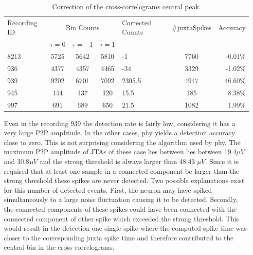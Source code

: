 \documentclass{article}
\begin{document}
\begin{table}[!h]
\begin{center}
\begin{tabular}{p{1.5cm}|c|c|c|p{1.3cm}|c|r}

\multicolumn{ 1}{p{1.5cm}|}{Recording ID} & \multicolumn{ 3}{c|}{Bin Counts} &  \multicolumn{ 1}{p{1.3cm}|}{Corrected Counts} & \multicolumn{ 1}{c|}{\#juxtaSpikes} & \multicolumn{ 1}{c}{Accuracy} \\ 
\multicolumn{ 1}{c|}{} & $\tau=0$ & $\tau=-1$ & $\tau=1$ & \multicolumn{ 1}{c|}{} & \multicolumn{ 1}{p{1.3cm}|}{} & \multicolumn{ 1}{l}{} \\ \hline
8213 & 5725 & 5642 & 5810 & -1 & 7760 & -0.01\% \\ \hline
936 & 4377 & 4357 & 4465 & -34 & 3329 & -1.02\% \\ \hline
939 & 9202 & 6701 & 7092 & 2305.5 & 4947 & 46.60\% \\ \hline
945 & 144 & 137 & 120 & 15.5 & 185 & 8.38\% \\ \hline
997 & 691 & 689 & 650 & 21.5 & 1082 & 1.99\% \\ \hline
\end{tabular}
\end{center}
\caption{Correction of the cross-correlograms central peak.}
\label{tab:CCcorrection}
\end{table}

Even in the recording 939 the detection rate is fairly low, considering it has a very large P2P amplitude.
In the other cases, phy yields a detection accuracy close to zero. This is not surprising considering the algorithm used by phy. The maximum P2P amplitude of JTAs of these case lies between lies between 19.4$\mu V$ and 30.8$\mu V$ and the strong threshold is always larger than 48.43 $\mu V$. Since it is required that at least one sample in a connected component be larger than the strong threshold these spikes are never detected. Two possible explanations exist for this number of detected events. First, the neuron may have spiked simultaneously to a large noise fluctuation causing it to be detected. Secondly, the connected components of these spikes could have been connected with the connected component of other spike which exceeded the strong threshold. This would result in the detection one single spike where the computed spike time was closer to the corresponding juxta spike time and therefore contributed to the central bin in the cross-correlograms.
\end{document}
